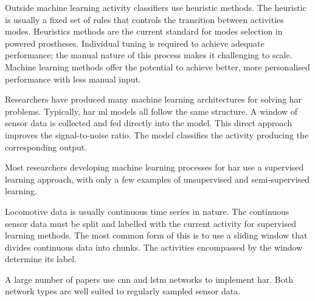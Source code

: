 Outside machine learning activity classifiers use heuristic methods. The heuristic is usually a fixed set of rules that controls the transition between activities modes. Heuristics methods are the current standard for modes selection in powered prostheses\cite{Varol2008, Lawson2014, Gorsic2014, Young2014a}. Individual tuning is required to achieve adequate performance; the manual nature of this process makes it challenging to scale\cite{Tucker2015}. Machine learning methods offer the potential to achieve better, more personalised performance with less manual input\cite{Hernandez2021, Zhu2019, Rai2019a}.

Researchers have produced many machine learning architectures for solving \acrshort{har} problems. Typically, \acrshort{har} \acrshort{ml} models all follow the same structure. A window of sensor data is collected and fed directly into the model. This direct approach improves the signal-to-noise ratio\cite{Hernandez2021}. The model classifies the activity producing the corresponding output.%


Most researchers developing machine learning processes for \acrshort{har} use a supervised learning approach\cite{Saini2020, Straczkiewicz2021}, with only a few examples of unsupervised and semi-supervised learning\cite{Bota2019}.

Locomotive data is usually continuous time series in nature. The continuous sensor data must be split and labelled with the current activity for supervised learning methods. The most common form of this is to use a sliding window that divides continuous data into chunks. The activities encompassed by the window determine its label.

A large number of papers use \acrfull{cnn} and \acrfull{lstm} networks to implement \acrshort{har}. Both network types are well suited to regularly sampled sensor data. 

